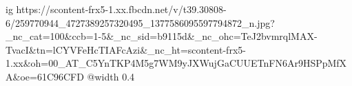  
 
 
 
 

\ifcmt
  ig https://scontent-frx5-1.xx.fbcdn.net/v/t39.30808-6/259770944_4727389257320495_1377586095597794872_n.jpg?_nc_cat=100&ccb=1-5&_nc_sid=b9115d&_nc_ohc=TeJ2bvmrqlMAX-TvacI&tn=lCYVFeHcTIAFcAzi&_nc_ht=scontent-frx5-1.xx&oh=00_AT_C5YnTKP4M5g7WM9yJXWujGaCUUETnFN6Ar9HSPpMfXA&oe=61C96CFD
  @width 0.4
\fi
